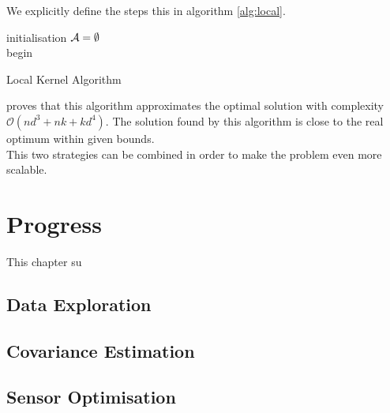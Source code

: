 \documentclass[12pt,twoside]{report}
\begin{document}
We explicitly define the steps  this in algorithm \ref{alg:local}. \\

\begin{algorithm}[h]
 initialisation\;
 $\mathcal{A} = \emptyset$ \\
 begin\;
\caption{Local Kernel Algorithm}
\label{alg:local}
\end{algorithm} 


\citet{krause_near-optimal_2008} proves that this algorithm approximates the optimal solution with complexity $\mathcal{O}(nd^3 + nk + kd^4)$. The solution found by this algorithm is close to the real optimum within given bounds. \\

This two strategies can be combined in order to make the problem even more scalable. 


\chapter{Progress}

This chapter su

\section{Data Exploration}

\section{Covariance Estimation}

\section{Sensor Optimisation}


\cite{cressie_statistics_1991}
\cite{arcucci_effective_2018}





\end{document}
